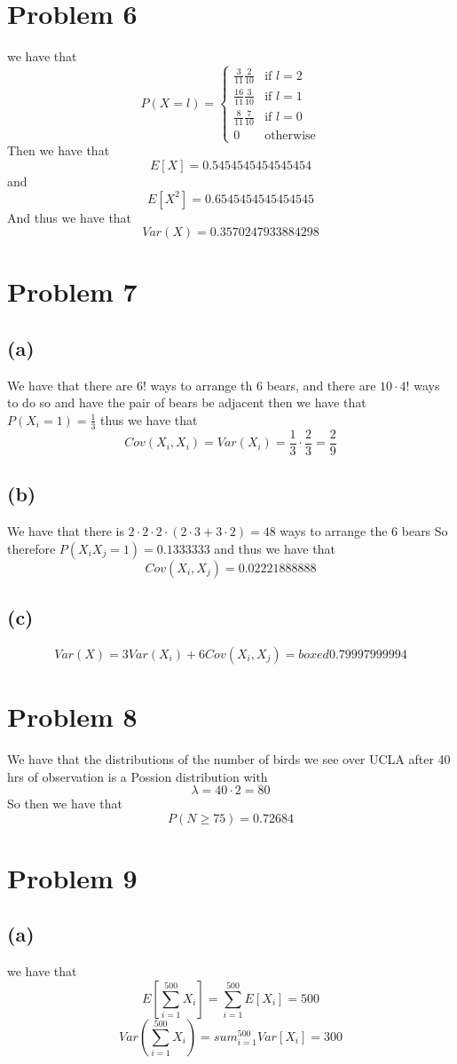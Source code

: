 \section*{Problem 6} 
we have that 
$$P(X=l)=\begin{cases}
    \frac{3}{11}\frac{2}{10} & \text{if } l=2\\
    \frac{16}{11}\frac{3}{10} & \text{if } l=1\\
    \frac{8}{11}\frac{7}{10} & \text{if } l=0\\
    0 & \text{otherwise}
\end{cases}$$
Then we have that 
$$E[X]=0.5454545454545454$$
and
$$E[X^2]=0.6545454545454545$$
And thus we have that 
$$Var(X)=\boxed{0.3570247933884298}$$
\section*{Problem 7}
\subsection*{(a)}
We have that there are $6!$ ways to arrange th 6 bears, and there
are $10\cdot 4!$ ways to do so and have the pair of bears be adjacent
then we have that 
$P(X_i=1)=\frac{1}{3}$
thus we have that
$$Cov(X_i,X_i)=Var(X_i)=\frac{1}{3}\cdot\frac{2}{3}=\boxed{\frac{2}{9}}$$
\subsection*{(b)}
We have that there is $2\cdot 2 \cdot 2 \cdot (2\cdot 3+ 3\cdot 2)=48$ ways to arrange the 6 bears
So therefore $P(X_iX_j=1)=0.1333333$
and thus we have that
$$Cov(X_i,X_j)=\boxed{0.02221888888}$$
\subsection*{(c)}
$$Var(X)=3Var(X_i)+6Cov(X_i,X_j)=boxed{0.79997999994}$$
\section*{Problem 8}
We have that the distributions of the number of birds we see over 
UCLA after 40 hrs of observation is a Possion distribution with
$$\lambda=40\cdot 2=80$$
So then we have that 
$$P(N\geq75)=\boxed{0.72684}$$
\section*{Problem 9}
\subsection*{(a)}
we have that
$$E[\sum_{i=1}^{500}X_i]=\sum_{i=1}^{500}E[X_i]=\boxed{500}$$
$$Var(\sum_{i=1}^{500}X_i)=sum_{i=1}^{500}Var[X_i]=\boxed{300}$$
